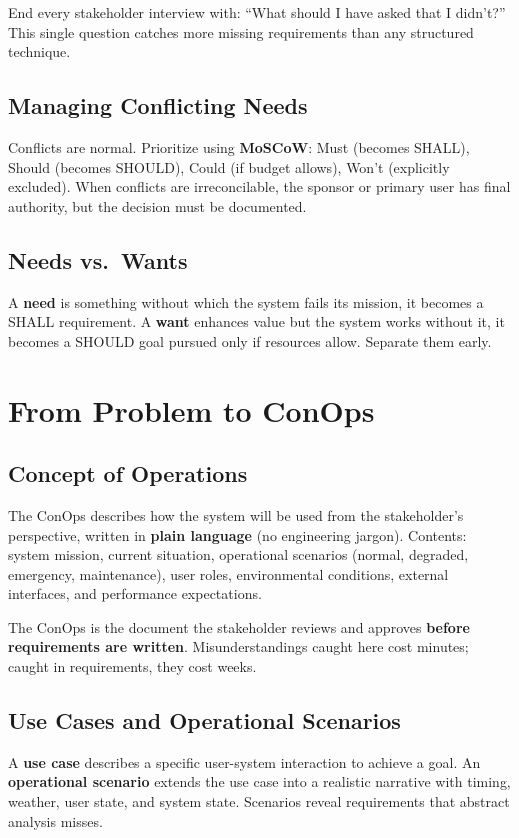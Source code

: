 \documentclass[11pt,letterpaper,twoside,openany]{book}
\begin{document}
\begin{tipbox}
End every stakeholder interview with: ``What should I have asked that I didn't?'' This single question catches more missing requirements than any structured technique.
\end{tipbox}

\subsection{Managing Conflicting Needs}
Conflicts are normal. Prioritize using \textbf{MoSCoW}: Must (becomes SHALL), Should (becomes SHOULD), Could (if budget allows), Won't (explicitly excluded). When conflicts are irreconcilable, the sponsor or primary user has final authority, but the decision must be documented.

\subsection{Needs vs.\ Wants}
A \textbf{need} is something without which the system fails its mission, it becomes a SHALL requirement. A \textbf{want} enhances value but the system works without it, it becomes a SHOULD goal pursued only if resources allow. Separate them early.

\section{From Problem to ConOps}
\subsection{Concept of Operations}
The ConOps describes how the system will be used from the stakeholder's perspective, written in \textbf{plain language} (no engineering jargon). Contents: system mission, current situation, operational scenarios (normal, degraded, emergency, maintenance), user roles, environmental conditions, external interfaces, and performance expectations.

The ConOps is the document the stakeholder reviews and approves \textbf{before requirements are written}. Misunderstandings caught here cost minutes; caught in requirements, they cost weeks.

\subsection{Use Cases and Operational Scenarios}
A \textbf{use case} describes a specific user-system interaction to achieve a goal. An \textbf{operational scenario} extends the use case into a realistic narrative with timing, weather, user state, and system state. Scenarios reveal requirements that abstract analysis misses.
\end{document}
